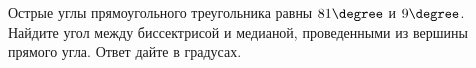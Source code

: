 \begin{ex}
	\begin{condition}
		Острые углы прямоугольного треугольника равны \( 81\degree \) и \( 9\degree \). Найдите угол между биссектрисой и медианой, проведенными из вершины прямого угла. Ответ дайте в градусах.
	\end{condition}
\end{ex}